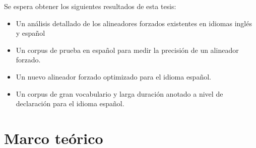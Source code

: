 Se espera obtener los siguientes resultados de esta tesis:

\begin{itemize}
    \item Un análisis detallado de los alineadores forzados existentes en idiomas inglés y español
    \item Un corpus de prueba en español para medir la precisión de un alineador forzado.
    \item Un nuevo alineador forzado optimizado para el idioma español.
    \item Un corpus de gran vocabulario y larga duración anotado a nivel de declaración para el idioma español.
\end{itemize}



\section{Marco teórico}



